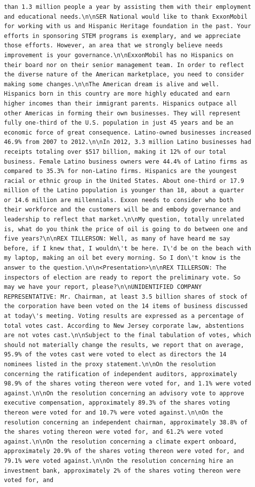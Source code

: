 \documentclass[
  letterpaper,
  DIV=11,
  numbers=noendperiod]{scrreprt}
\begin{document}
\begin{verbatim}
than 1.3 million people a year by assisting them with their employment and educational needs.\n\nSER National would like to thank ExxonMobil for working with us and Hispanic Heritage foundation in the past. Your efforts in sponsoring STEM programs is exemplary, and we appreciate those efforts. However, an area that we strongly believe needs improvement is your governance.\n\nExxonMobil has no Hispanics on their board nor on their senior management team. In order to reflect the diverse nature of the American marketplace, you need to consider making some changes.\n\nThe American dream is alive and well. Hispanics born in this country are more highly educated and earn higher incomes than their immigrant parents. Hispanics outpace all other Americas in forming their own businesses. They will represent fully one-third of the U.S. population in just 45 years and be an economic force of great consequence. Latino-owned businesses increased 46.9% from 2007 to 2012.\n\nIn 2012, 3.3 million Latino businesses had receipts totaling over $517 billion, making it 12% of our total business. Female Latino business owners were 44.4% of Latino firms as compared to 35.3% for non-Latino firms. Hispanics are the youngest racial or ethnic group in the United States. About one-third or 17.9 million of the Latino population is younger than 18, about a quarter or 14.6 million are millennials. Exxon needs to consider who both their workforce and the customers will be and embody governance and leadership to reflect that market.\n\nMy question, totally unrelated is, what do you think the price of oil is going to do between one and five years?\n\nREX TILLERSON: Well, as many of have heard me say before, if I knew that, I wouldn\'t be here. I\'d be on the beach with my laptop, making an oil bet every morning. So I don\'t know is the answer to the question.\n\n<Presentation>\n\nREX TILLERSON: The inspectors of election are ready to report the preliminary vote. So may we have your report, please?\n\nUNIDENTIFIED COMPANY REPRESENTATIVE: Mr. Chairman, at least 3.5 billion shares of stock of the corporation have been voted on the 14 items of business discussed at today\'s meeting. Voting results are expressed as a percentage of total votes cast. According to New Jersey corporate law, abstentions are not votes cast.\n\nSubject to the final tabulation of votes, which should not materially change the results, we report that on average, 95.9% of the votes cast were voted to elect as directors the 14 nominees listed in the proxy statement.\n\nOn the resolution concerning the ratification of independent auditors, approximately 98.9% of the shares voting thereon were voted for, and 1.1% were voted against.\n\nOn the resolution concerning an advisory vote to approve executive compensation, approximately 89.3% of the shares voting thereon were voted for and 10.7% were voted against.\n\nOn the resolution concerning an independent chairman, approximately 38.8% of the shares voting thereon were voted for, and 61.2% were voted against.\n\nOn the resolution concerning a climate expert onboard, approximately 20.9% of the shares voting thereon were voted for, and 79.1% were voted against.\n\nOn the resolution concerning hire an investment bank, approximately 2% of the shares voting thereon were voted for, and 
\end{verbatim}
\end{document}
